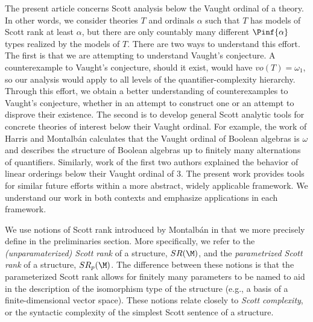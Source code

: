 \documentclass[10pt,a4paper]{amsart}
\renewcommand{\-}{\text{-}}
\begin{document}
The present article concerns Scott analysis below the Vaught ordinal of a theory.
In other words, we consider theories $T$ and ordinals $\alpha$ such that $T$ has models of Scott rank at least $\alpha$, but there are only countably many different $\Pinf{\alpha}$ types realized by the models of $T$.
There are two ways to understand this effort.
The first is that we are attempting to understand Vaught's conjecture.
A counterexample to Vaught's conjecture, should it exist, would have $vo(T)=\omega_1$, so our analysis would apply to all levels of the quantifier-complexity hierarchy.
Through this effort, we obtain a better understanding of counterexamples to Vaught's conjecture, whether in an attempt to construct one or an attempt to disprove their existence.
The second is to develop general Scott analytic tools for concrete theories of interest below their Vaught ordinal.
For example, the work of Harris and Montalbán \cite{HM} calculates that the Vaught ordinal of Boolean algebras is $\omega$ and describes the structure of Boolean algebras up to finitely many alternations of quantifiers.
Similarly, work of the first two authors \cite{GR24} explained the behavior of linear orderings below their Vaught ordinal of 3.
The present work provides tools for similar future efforts within a more abstract, widely applicable framework.
We understand our work in both contexts and emphasize applications in each framework.

We use notions of Scott rank introduced by Montalbán in \cite{MonSR} that we more precisely define in the preliminaries section.
More specifically, we refer to the \emph{(unparamaterized) Scott rank} of a structure, $SR(\M)$, and the \emph{parametrized Scott rank} of a structure, $SR_p(\M)$.
The difference between these notions is that the parameterized Scott rank allows for finitely many parameters to be named to aid in the description of the isomorphism type of the structure (e.g., a basis of a finite-dimensional vector space).
These notions relate closely to \emph{Scott complexity}, or the syntactic complexity of the simplest Scott sentence of a structure.
\end{document}
